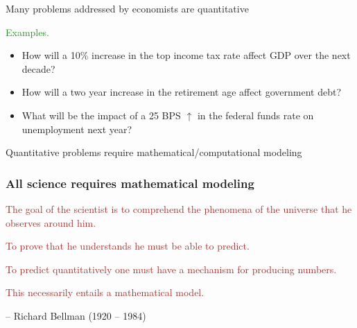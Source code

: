 \documentclass[
    xcolor={svgnames,dvipsnames},
    hyperref={colorlinks, citecolor=DeepPink4, linkcolor=DarkRed, urlcolor=DarkBlue}
    ]{beamer}  %
\newcommand{\Egs}{\textcolor{ForestGreen}{Examples. }}
\newcommand{\brown}[1]{\textcolor{Brown}{\sf #1}}
\newcommand{\1}{\mathbbm 1}
\begin{document}
\begin{frame}
    
    Many problems addressed by economists are quantitative

            \vspace{0.3em}
            \vspace{0.3em}

    \Egs 
    \begin{itemize}
        \item How will a 10\% increase in the top income tax rate affect GDP
            over the next decade?
            \vspace{0.3em}
            \vspace{0.3em}
        \item How will a two year increase in the retirement age affect
            government debt?
            \vspace{0.3em}
            \vspace{0.3em}
        \item What will be the impact of a 25 BPS $\uparrow$ in the federal
            funds rate on unemployment next year?
    \end{itemize}

            \vspace{0.3em}
            \vspace{0.3em}

    \begin{center}
        Quantitative problems require mathematical/computational modeling
    \end{center}


\end{frame}


\begin{frame}
    \frametitle{All science requires mathematical modeling}

    \pause

    \brown{The goal of the scientist is to comprehend the phenomena of the
    universe that he observes around him.}

            \vspace{0.3em}
    \brown{To prove that he understands he must be able to predict.}

            \vspace{0.3em}
    \brown{To predict quantitatively one must have a mechanism for producing
    numbers.}

            \vspace{0.3em}
    \brown{This necessarily entails a mathematical model.}

            \vspace{0.3em}
            \vspace{0.3em}
            \vspace{0.3em}
     -- Richard Bellman (1920 -- 1984)

\end{frame}
\end{document}
